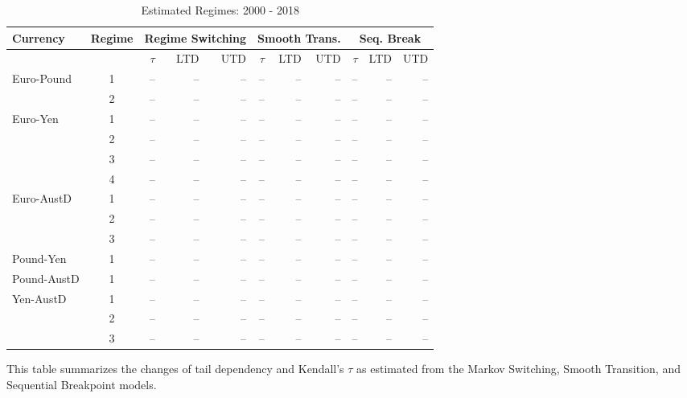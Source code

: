 \documentclass[12pt]{article}
\begin{document}
\begin{table}
\begin{tabular}[c]{l c r r r | r r r | r r r}
	\midrule
	Currency & Regime & \multicolumn{3}{c}{Regime Switching} & \multicolumn{3}{c}{Smooth Trans.} & \multicolumn{3}{c}{Seq. Break} \\
	\midrule
				&   & $\tau$ & LTD & UTD & $\tau$ & LTD & UTD & $\tau$ & LTD & UTD \\
	\midrule
	Euro-Pound  & 1 &     -- &  -- &  -- &     -- &  -- &  -- &     -- &  -- &  -- \\
				& 2 &     -- &  -- &  -- &     -- &  -- &  -- &     -- &  -- &  -- \\
	Euro-Yen    & 1 &     -- &  -- &  -- &     -- &  -- &  -- &     -- &  -- &  -- \\
				& 2 &     -- &  -- &  -- &     -- &  -- &  -- &     -- &  -- &  -- \\
				& 3 &     -- &  -- &  -- &     -- &  -- &  -- &     -- &  -- &  -- \\
				& 4 &     -- &  -- &  -- &     -- &  -- &  -- &     -- &  -- &  -- \\
	Euro-AustD  & 1 &     -- &  -- &  -- &     -- &  -- &  -- &     -- &  -- &  -- \\
				& 2 &     -- &  -- &  -- &     -- &  -- &  -- &     -- &  -- &  -- \\
				& 3 &     -- &  -- &  -- &     -- &  -- &  -- &     -- &  -- &  -- \\
	Pound-Yen   & 1 &     -- &  -- &  -- &     -- &  -- &  -- &     -- &  -- &  -- \\
	Pound-AustD & 1 &     -- &  -- &  -- &     -- &  -- &  -- &     -- &  -- &  -- \\
	Yen-AustD   & 1 &     -- &  -- &  -- &     -- &  -- &  -- &     -- &  -- &  -- \\
				& 2 &     -- &  -- &  -- &     -- &  -- &  -- &     -- &  -- &  -- \\
				& 3 &     -- &  -- &  -- &     -- &  -- &  -- &     -- &  -- &  -- \\
\end{tabular}
\caption{Estimated Regimes: 2000 - 2018}
\begin{tablenotes}
	\item{\footnotesize This table summarizes the changes of tail dependency and Kendall's $\tau$ as estimated from the Markov Switching, Smooth Transition, and Sequential Breakpoint models.}
\end{tablenotes}
\end{table}


\printbibliography
\end{document}
